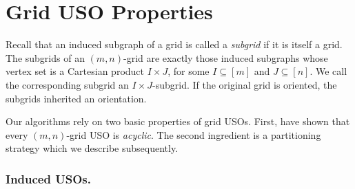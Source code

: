 \documentclass[runningheads,a4paper]{llncs}
\newcommand{\JN}[1]{\marginpar{\parbox{3.6cm}{{\small {\bf JN:} #1}}}} %
\begin{document}


\section{Grid USO Properties}\label{section:grid_uso_properties}




Recall that an induced subgraph of a grid is called a \emph{subgrid} if it is itself a grid.
The subgrids of an $(m,n)$-grid are exactly those induced subgraphs whose vertex set is a
Cartesian product $I \times J$, for some $I \subseteq [m]$ and $J \subseteq [n]$. We call the corresponding subgrid an $I\times J$-subgrid.
If the original grid is oriented, the subgrids inherited an orientation. 

Our algorithms rely on two basic properties of grid USOs.
First, \citet{grid08} have shown that every $(m,n)$-grid USO is \emph{acyclic}. 
The second ingredient is a partitioning strategy which we describe subsequently.

\vspace{-.2in}\subsubsection{Induced USOs.}
\end{document}
